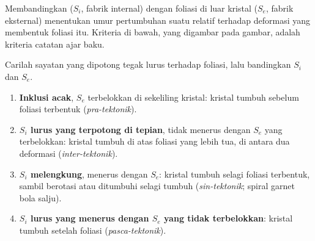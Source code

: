 Membandingkan  ($S_i$, fabrik internal) dengan foliasi di luar kristal
($S_e$, fabrik eksternal) menentukan umur pertumbuhan suatu  relatif terhadap deformasi yang
membentuk foliasi itu. Kriteria di bawah, yang digambar pada gambar, adalah kriteria catatan ajar baku.

\begin{method}\label{met:b2:field-lab-methods-2:timing}
Carilah sayatan yang dipotong tegak lurus terhadap foliasi, lalu bandingkan $S_i$ dan $S_e$.
\begin{enumerate}
  \item \textbf{Inklusi acak}, $S_e$ terbelokkan di sekeliling kristal: kristal tumbuh sebelum
        foliasi terbentuk (\emph{pra-tektonik}).
  \item \textbf{$S_i$ lurus yang terpotong di tepian}, tidak menerus dengan $S_e$ yang terbelokkan: kristal tumbuh
        di atas foliasi yang lebih tua, di antara dua deformasi (\emph{inter-tektonik}).
  \item \textbf{$S_i$ melengkung}, menerus dengan $S_e$: kristal tumbuh selagi foliasi terbentuk, sambil berotasi
        atau ditumbuhi selagi tumbuh (\emph{sin-tektonik}; spiral garnet bola salju).
  \item \textbf{$S_i$ lurus yang menerus dengan $S_e$ yang tidak terbelokkan}: kristal tumbuh setelah foliasi
        (\emph{pasca-tektonik}).
\end{enumerate}
\end{method}

